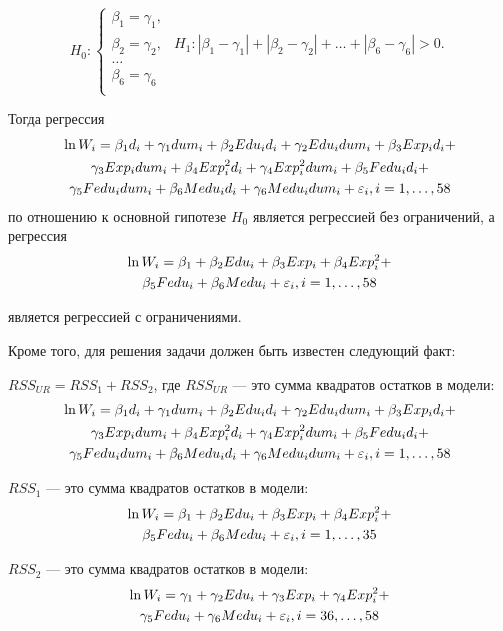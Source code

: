 \begin{problem}
\begin{sol}
\[
H_0:
  \begin{cases}
    \beta_1 =\gamma_1, \\
    \beta_2 =\gamma_2 , & H_1:|\beta_1-\gamma_1|+|\beta_2-\gamma_2|+\dots+|\beta_6-\gamma_6| > 0.\\
    \dots   \\
    \beta_6=\gamma_6 \\
 \end{cases}
\]

Тогда регрессия
\begin{multline*}
\ln W_i=\beta_1 d_i+\gamma_1 dum_i+\beta_2 Edu_i d_i+\gamma_2 Edu_i dum_i+\beta_3 Exp_i d_i+\\
\gamma_3 Exp_i dum_i+\beta_4 Exp_i^2 d_i+
\gamma_4 Exp_i^2 dum_i+\beta_5 Fedu_i d_i +\\
\gamma_5 Fedu_i dum_i+\beta_6 Medu_i d_i+\gamma_6 Medu_i dum_i+\varepsilon_i, i=1, \ldots, 58
\end{multline*}
по отношению к основной гипотезе $H_0$ является регрессией без ограничений, а регрессия
\begin{multline*}
\ln W_i=\beta_1 +\beta_2 Edu_i+\beta_3 Exp_i+\beta_4 Exp_i^2+\\
\beta_5 Fedu_i+\beta_6 Medu_i+\varepsilon_i, i=1, \ldots, 58
\end{multline*}

является регрессией с ограничениями.

Кроме того, для решения задачи должен быть известен следующий факт:

$RSS_{UR}=RSS_1+RSS_2$, где $RSS_{UR}$ — это сумма квадратов остатков в модели:
\begin{multline*}
\ln W_i=\beta_1  d_i+\gamma_1 dum_i+\beta_2 Edu_i d_i+\gamma_2 Edu_i dum_i+\beta_3 Exp_i d_i+\\
\gamma_3 Exp_i dum_i+\beta_4 Exp_i^2 d_i
+ \gamma_4 Exp_i^2 dum_i+\beta_5 Fedu_i d _i +\\
\gamma_5 Fedu_i dum_i+\beta_6 Medu_i d_i+\gamma_6 Medu_i dum_i+\varepsilon_i, i=1, \ldots, 58
\end{multline*}

$RSS_1$ — это сумма квадратов остатков в модели:
\begin{multline*}
\ln W_i=\beta_1 +\beta_2 Edu_i+\beta_3 Exp_i+\beta_4 Exp_i^2+\\
\beta_5 Fedu_i+\beta_6 Medu_i+\varepsilon_i, i=1, \ldots, 35
\end{multline*}

$RSS_2$ — это сумма квадратов остатков в модели:
\begin{multline*}
\ln W_i=\gamma_1 +\gamma_2 Edu_i+\gamma_3 Exp_i+\gamma_4 Exp_i^2+\\
\gamma_5 Fedu_i+\gamma_6 Medu_i+\varepsilon_i, i=36, \ldots, 58
\end{multline*}



\end{sol}
\end{problem}
